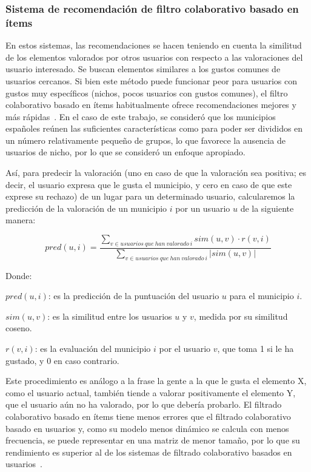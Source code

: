 \subsubsection{Sistema de recomendación de filtro colaborativo basado en ítems}

En estos sistemas, las recomendaciones se hacen teniendo en cuenta la similitud de los elementos valorados por otros usuarios con respecto a las valoraciones del usuario interesado. Se buscan elementos similares a los gustos comunes de usuarios cercanos. Si bien este método puede funcionar peor para usuarios con gustos muy específicos (nichos, pocos usuarios con gustos comunes), el filtro colaborativo basado en ítems habitualmente ofrece recomendaciones mejores y más rápidas~\cite{filtro_colaborativo_2}. En el caso de este trabajo, se consideró que los municipios españoles reúnen las suficientes características como para poder ser divididos en un número relativamente pequeño de grupos, lo que favorece la ausencia de usuarios de nicho, por lo que se consideró un enfoque apropiado.

Así, para predecir la valoración (uno en caso de que la valoración sea positiva; es decir, el usuario expresa que le gusta el municipio, y cero en caso de que este exprese su rechazo) de un lugar para un determinado usuario, calcularemos la predicción de la valoración de un municipio $i$ por un usuario $u$ de la siguiente manera:

$$pred(u, i) = \frac{\sum_{v \in usuarios \ que \ han \ valorado \ i} sim(u, v) \cdot r(v, i)}{\sum_{v \in usuarios \ que \ han \ valorado \ i} |sim(u, v)|}$$

Donde:

$pred(u, i)$: es la predicción de la puntuación del usuario $u$ para el municipio $i$.

$sim(u, v)$: es la similitud entre los usuarios $u$ y $v$, medida por su similitud coseno.

$r(v, i)$: es la evaluación del municipio $i$ por el usuario $v$, que toma 1 si le ha gustado, y 0 en caso contrario.

Este procedimiento es análogo a la frase \guillemotleft la gente a la que le gusta el elemento X, como el usuario actual, también tiende a valorar positivamente el elemento Y, que el usuario aún no ha valorado, por lo que debería probarlo\guillemotright. El filtrado colaborativo basado en ítems tiene menos errores que el filtrado colaborativo basado en usuarios y, como su modelo menos dinámico se calcula con menos frecuencia, se puede representar en una matriz de menor tamaño, por lo que su rendimiento es superior al de los sistemas de filtrado colaborativo basados en usuarios~\cite{filtro_colaborativo_3}.

